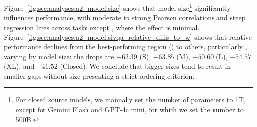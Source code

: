 %
Figure~\ref{fig:sec:analyses:a2_model:size} shows that model size\footnote{For closed source models, we manually set the number of parameters to 1T, except for Gemini Flash and GPT-4o mini, for which we set the number to 500B.} significantly influences performance, with moderate to strong Pearson correlations and steep regression lines across tasks except \coqar, where the effect is minimal.
%
Figure~\ref{fig:sec:analyses:a2_model:sivqa_relative_diffs_to_w} shows that relative performance declines from the best-performing region (\RegW) to others, particularly \RegSA, varying by model size: the drops are $-63.39$ (S), $-63.85$ (M), $-50.60$ (L), $-54.57$ (XL), and $-41.52$ (Closed). We conclude that bigger sizes tend to result in smaller gaps without size presenting a strict ordering criterion.
%

